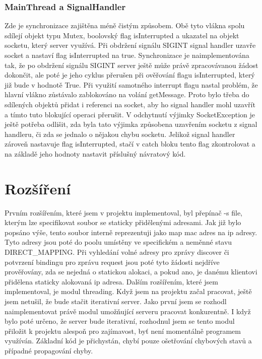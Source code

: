 \documentclass[12pt,a4paper]{report}
\begin{document}
\subsection*{MainThread a SignalHandler}
Zde je synchronizace zajištěna méně čistým způsobem. Obě tyto vlákna spolu sdílejí objekt typu Mutex, boolovský flag isInterrupted a ukazatel na objekt socketu, který server využívá. Při obdržení signálu SIGINT signal handler uzavře socket a nastaví flag isInterrupted na true. Synchronizace je naimplementována tak, že po obdržení signálu SIGINT server ještě může právě zpracovávanou žádost dokončit, ale poté je jeho cyklus přerušen při ověřování flagu isInterrupted, který již bude v hodnotě True. Při využití samotného interrupt flagu nastal problém, že hlavní vlákno zůstávalo zablokováno na volání getMessage. Proto bylo třeba do sdílených objektů přidat i referenci na socket, aby ho signal handler mohl uzavřít a tímto tuto blokující operaci přerušit. V odchytnutí výjimky SocketException je ještě potřeba odlišit, zda byla tato výjimka způsobena uzavřením socketu z signal handleru, či zda se jednalo o nějakou chybu socketu. Jelikož signal handler zároveň nastavuje flag isInterrupted, stačí v catch bloku tento flag zkontrolovat a na základě jeho hodnoty nastavit příslušný návratový kód. 
\chapter{Rozšíření}
Prvním rozšířením, které jsem v projektu implementoval, byl přepínač -s file, kterým lze specifikovat soubor se staticky přidělenými adresami. Jak již bylo popsáno výše, tento soubor interně reprezentuji jako map mac adres na ip adresy. Tyto adresy jsou poté do poolu umístěny ve specifickém a neměnné stavu DIRECT\_MAPPING. Při vyhledání volné adresy pro zprávy discover či potvrzení bindingu pro zprávu request jsou poté tyto žádosti nejdříve prověřovány, zda se nejedná o statickou alokaci, a pokud ano, je danému klientovi přidělena staticky alokovaná ip adresa.
Dalším rozšířením, které jsem implementoval, je modul threading. Když jsem na projektu začal pracovat, ještě jsem netušil, že bude stačit iterativní server. Jako první jsem se rozhodl naimplementovat právě modul umožňující serveru pracovat konkurentně. I když bylo poté určeno, že server bude iterativní, rozhodnul jsem se tento modul přiložit k projektu alespoň pro zajímavost, byť není momentálně programem využíván. Základní kód je přichystán, chybí pouze ošetřování chybových stavů a případné propagování chyby. 
\end{document}
